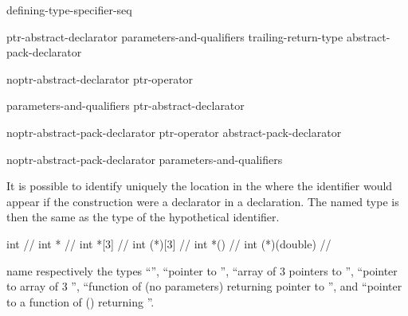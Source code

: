 \begin{bnf}
\br
    defining-type-specifier-seq 
\end{bnf}

\begin{bnf}
\br
    ptr-abstract-declarator\br
     parameters-and-qualifiers trailing-return-type\br
    abstract-pack-declarator
\end{bnf}

\begin{bnf}
\br
    noptr-abstract-declarator\br
    ptr-operator 
\end{bnf}

\begin{bnf}
\br
     parameters-and-qualifiers\br
     \terminal{[}  \terminal{]} \br
    \terminal{(} ptr-abstract-declarator \terminal{)}
\end{bnf}

\begin{bnf}
\br
    noptr-abstract-pack-declarator\br
    ptr-operator abstract-pack-declarator
\end{bnf}

\begin{bnf}
\br
    noptr-abstract-pack-declarator parameters-and-qualifiers\br
\end{bnf}

It is possible to identify uniquely the location in the
where the identifier would appear if the construction were a declarator
in a declaration.
The named type is then the same as the type of the
hypothetical identifier.
\begin{example}
\begin{codeblock}
int                 // 
int *               // 
int *[3]            // 
int (*)[3]          // 
int *()             // 
int (*)(double)     // 
\end{codeblock}
name respectively the types
``'',
``pointer to
'',
``array of 3 pointers to
'',
``pointer to array of 3
'',
``function of (no parameters) returning pointer to
'',
and ``pointer to a function of
()
returning
''.
\end{example}

